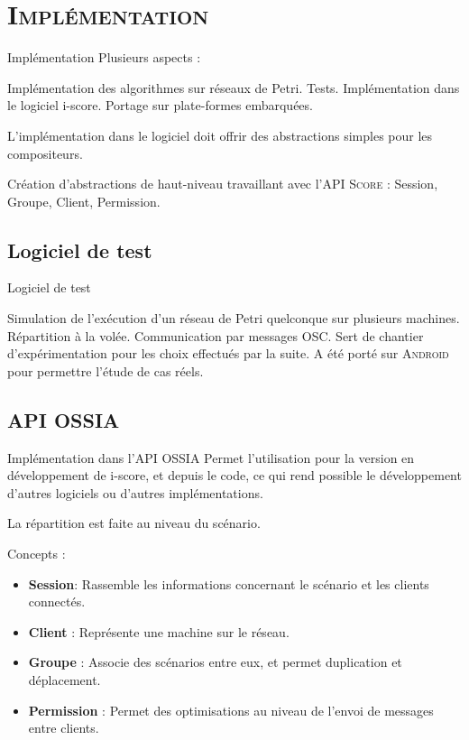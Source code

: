 \section{\scshape Implémentation}
\begin{frame}{Implémentation}
	Plusieurs aspects : 
	
	\begin{itemize}
		\itemar Implémentation des algorithmes sur réseaux de Petri.
		\itemar Tests.
		\itemar Implémentation dans le logiciel i-score.
		\itemar Portage sur plate-formes embarquées.
	\end{itemize}
	
	L'implémentation dans le logiciel doit offrir des abstractions simples pour les compositeurs.
	
	\begin{itemize}
		\itemar Création d'abstractions de haut-niveau travaillant avec l'\textsc{API Score} : Session, Groupe, Client, Permission.
	\end{itemize}
\end{frame}

\subsection{Logiciel de test}
\begin{frame}{Logiciel de test}
	\begin{itemize}
		\itemar Simulation de l'exécution d'un réseau de Petri quelconque sur plusieurs machines.
		\itemar Répartition à la volée.
		\itemar Communication par messages \textsc{OSC}.
		\itemar Sert de chantier d'expérimentation pour les choix effectués par la suite.
		\itemar A été porté sur \textsc{Android} pour permettre l'étude de cas réels.
	\end{itemize}
\end{frame}

\subsection{API OSSIA}
\begin{frame}{Implémentation dans l'API OSSIA}
	Permet l'utilisation pour la version en développement de i-score, et depuis le code, ce qui rend possible le développement d'autres logiciels ou d'autres implémentations.
	
	La répartition est faite au niveau du scénario.
	
	Concepts : 
	\begin{itemize}
		\item \textbf{Session}: Rassemble les informations concernant le scénario et les clients connectés. 
		\item \textbf{Client} :  Représente une machine sur le réseau.
		\item \textbf{Groupe} :  Associe des scénarios entre eux, et permet duplication et déplacement.
		\item \textbf{Permission} :  
		Permet des optimisations au niveau de l'envoi de messages entre clients.
	\end{itemize}
\end{frame}

